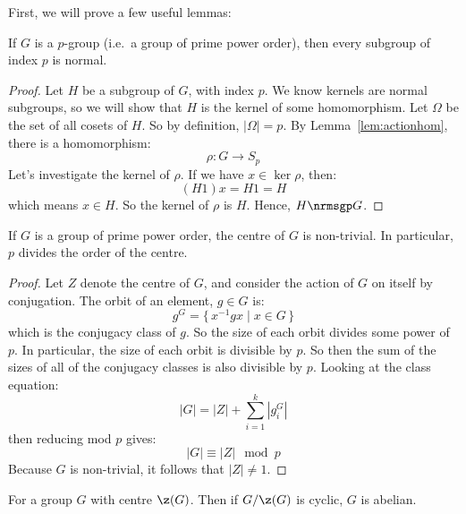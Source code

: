 First, we will prove a few useful lemmas:

\begin{lemma}\label{lem:index_p_normal}
    If \(G\) is a \(p\)-group (i.e.\ a group of prime power order), then every subgroup of index \(p\) is normal.
\end{lemma}

\begin{proof}
    Let \(H\) be a subgroup of \(G\), with index \(p\).
    We know kernels are normal subgroups, so we will show that \(H\) is the kernel of some homomorphism. %
    Let \(\Omega\) be the set of all cosets of \(H\).
    So by definition, \(|\Omega| = p\).
    By Lemma~\ref{lem:actionhom}, there is a homomorphism:
    \[\rho:G \to S_p\]
    Let's investigate the kernel of \(\rho\).
    If we have \(x \in \ker{\rho}\), then:
    \[(H1)x = H1 = H\]
    which means \(x \in H\).
    So the kernel of \(\rho\) is \(H\).
    Hence, \(H \nrmsgp G\).
\end{proof}

\begin{lemma}\label{lem:z_non_trivial}
    If \(G\) is a group of prime power order, the centre of \(G\) is non-trivial.
    In particular, \(p\) divides the order of the centre.
\end{lemma}

\begin{proof}
    Let \(Z\) denote the centre of \(G\), and consider the action of \(G\) on itself by conjugation.
    The orbit of an element, \(g \in G\) is:
    \[g^G = \{\,x^{-1}gx \mid x \in G\,\}\]
    which is the conjugacy class of \(g\).
    So the size of each orbit divides some power of \(p\).
    In particular, the size of each orbit is divisible by \(p\).
    So then the sum of the sizes of all of the conjugacy classes is also divisible by \(p\).
    Looking at the class equation:
    \[|G| = |Z| + \sum_{i=1}^k |g_i^G|\]
    then reducing mod \(p\) gives:
    \[|G| \equiv |Z| \mod{p}\]
    Because \(G\) is non-trivial, it follows that \(|Z| \neq 1\).

\end{proof}

\begin{lemma}\label{lem:cyclic_over_centre}
    For a group \(G\) with centre \(\z(G)\).
    Then if \(G/\z(G)\) is cyclic, \(G\) is abelian.
\end{lemma}

